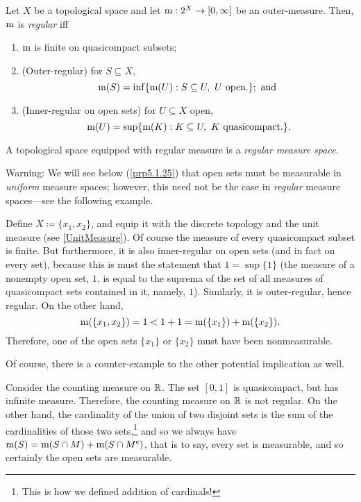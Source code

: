 \begin{dfn}\label{RegularMeasure}
Let $X$ be a topological space and let $\mathrm{m} :2^X\rightarrow [0,\infty ]$ be an outer-measure.  Then, $\mathrm{m}$ is \emph{regular} iff
\begin{enumerate}
\item $\mathrm{m}$ is finite on quasicompact subsets;
\item (Outer-regular) for $S\subseteq X$,
\begin{equation}
\meas (S)=\inf \{ \meas (U):S\subseteq U,\ U\text{ open.}\} ;\text{ and }
\end{equation}
\item (Inner-regular on open sets) for $U\subseteq X$ open,
\begin{equation}
\mathrm{m} (U)=\sup \{ \mathrm{m} (K):K\subseteq U,\ K\text{ quasicompact.}\} .
\end{equation}
\end{enumerate}
A topological space equipped with regular measure is a \emph{regular measure space}.
\begin{rmk}
Warning:  We will see below (\cref{prp5.1.25}) that open sets must be measurable in \emph{uniform} measure spaces; however, this need not be the case in \emph{regular} measure spaces---see the following example.
\end{rmk}
\end{dfn}
\begin{exm}\label{exm5.1.42}
Define $X\coloneqq \{ x_1,x_2\}$, and equip it with the discrete topology and the unit measure (see \cref{UnitMeasure}).  Of course the measure of every quasicompact subset is finite.  But furthermore, it is also inner-regular on open sets (and in fact on every set), because this is must the statement that $1=\sup \{ 1\}$ (the measure of a nonempty open set, $1$, is equal to the suprema of the set of all measures of quasicompact sets contained in it, namely, $1$).  Similarly, it is outer-regular, hence regular.  On the other hand,
\begin{equation}
\mathrm{m} (\{ x_1,x_2\} )=1<1+1=\mathrm{m} (\{ x_1\} )+\mathrm{m} (\{ x_2\} ).
\end{equation}
Therefore, one of the open sets $\{ x_1\}$ or $\{ x_2\}$ must have been nonmeasurable.
\end{exm}
Of course, there is a counter-example to the other potential implication as well.
\begin{exm}
Consider the counting measure on $\mathbb{R}$.  The set $[0,1]$ is quasicompact, but has infinite measure.  Therefore, the counting measure on $\mathbb{R}$ is not regular.  On the other hand, the cardinality of the union of two disjoint sets is the sum of the cardinalities of those two sets,\footnote{This is how we defined addition of cardinals!} and so we always have $\mathrm{m} (S)=\mathrm{m} (S\cap M)+\mathrm{m} (S\cap M^{\mathsf{c}})$, that is to say, every set is measurable, and so certainly the open sets are measurable.
\end{exm}

